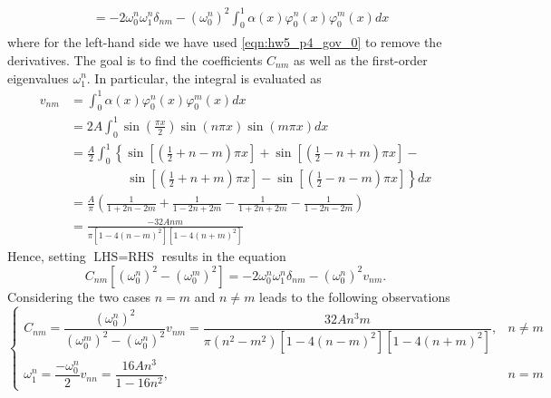 \begin{enumerate}[(i)]
{\begin{subequations}
\begin{align}
\begin{split}
        &= -2\omega_0^n \omega_1^n \delta_{nm} - {(\omega_0^n)}^2 \int_0^1 \alpha(x) \varphi_0^n(x) \varphi_0^m(x) dx
    \end{split}
    \end{align}
    \end{subequations}
    where for the left-hand side we have used \cref{eqn:hw5_p4_gov_0} to remove the derivatives.
    The goal is to find the coefficients $C_{nm}$ as well as the first-order eigenvalues $\omega_1^n$. 
    In particular, the integral is evaluated as 
    \begin{equation}
    \begin{aligned}
        v_{nm} 
        &= \int_0^1 \alpha(x) \varphi_0^n(x) \varphi_0^m(x) dx \\
        &= 2A \int_0^1 \sin\left(\frac{\pi x}{2}\right) \sin\left(n\pi x\right) \sin\left(m\pi x\right) dx \\
        &= \frac{A}{2} \int_0^1 \left\{
            \sin\left[\left(\frac{1}{2}+n-m\right)\pi x\right]+  
            \sin\left[\left(\frac{1}{2}-n+m\right)\pi x\right]-
        \right. \\ & \qquad \qquad ~~ \left.
            \sin\left[\left(\frac{1}{2}+n+m\right)\pi x\right]-
            \sin\left[\left(\frac{1}{2}-n-m\right)\pi x\right]
            \right\} dx \\
        &= \frac{A}{\pi} \left(\frac{1}{1+2n-2m} + \frac{1}{1-2n+2m} - \frac{1}{1+2n+2m} - \frac{1}{1-2n-2m}\right) \\
        &=\frac{-32 A nm}{\pi\left[1 - 4{(n-m)}^2\right] \left[1 - 4{(n+m)}^2\right]}
    \end{aligned}
    \end{equation}
    Hence, setting $\textrm{LHS} = \textrm{RHS}$ results in the equation
    \begin{equation}
        C_{nm} \left[{(\omega_0^n)}^2 - {(\omega_0^m)}^2 \right] = -2\omega_0^n \omega_1^n \delta_{nm} - {(\omega_0^n)}^2 v_{nm}.
    \end{equation}
    Considering the two cases $n = m$ and $n \neq m$ leads to the following observations
    \begin{equation}
        \begin{cases}
            C_{nm} = \dfrac{{(\omega_0^n)}^2}{{(\omega_0^m)}^2 - {(\omega_0^n)}^2} v_{nm} = \dfrac{32 A n^3 m}{\pi(n^2 - m^2)\left[1 - 4{(n-m)}^2\right] \left[1 - 4{(n+m)}^2\right]}, & n \neq m \\
            \omega_1^n = \dfrac{-\omega_0^n}{2}v_{nn}  = \dfrac{16 A n^3}{1 - 16n^2}, & n = m

\end{cases}
\end{equation}}
\end{enumerate}
